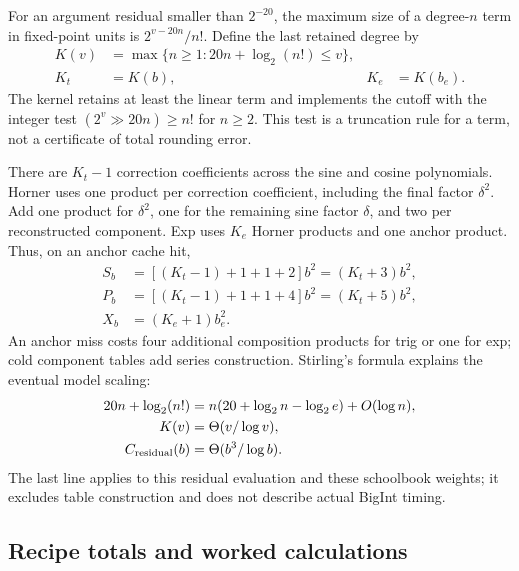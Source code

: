 \documentclass[11pt,a4paper]{article}
\numberwithin{equation}{section}
\begin{document}
For an argument residual smaller than \(2^{-20}\), the maximum size
of a degree-\(n\) term in fixed-point units is \(2^{v-20n}/n!\).
Define the last retained degree by
\begin{align}
  K(v)&=\max\{n\ge1:20n+\log_2(n!)\le v\},\\
  K_t&=K(b), &K_e&=K(b_e).
\end{align}
The kernel retains at least the linear term and implements the cutoff
with the integer test \((2^v\gg20n)\ge n!\) for \(n\ge2\). This
test is a truncation rule for a term, not a certificate of total
rounding error.

There are \(K_t-1\) correction coefficients across the sine and
cosine polynomials. Horner uses one product per correction
coefficient, including the final factor \(\delta^2\). Add one product
for \(\delta^2\), one for the remaining sine factor \(\delta\), and
two per reconstructed component. Exp uses \(K_e\) Horner products
and one anchor product. Thus, on an anchor cache hit,
\begin{align}
  S_b&=[(K_t-1)+1+1+2]b^2=(K_t+3)b^2,\\
  P_b&=[(K_t-1)+1+1+4]b^2=(K_t+5)b^2,\\
  X_b&=(K_e+1)b_e^2.
\end{align}
An anchor miss costs four additional composition products for trig or
one for exp; cold component tables add series construction. Stirling's
formula explains the eventual model scaling:
\begin{align}
  20n+\log_2(n!)
    &=n(20+\log_2 n-\log_2 e)+O(\log n),\\
  K(v)&=\Theta(v/\log v),\\
  C_{\rm residual}(b)&=\Theta(b^3/\log b).
\end{align}
The last line applies to this residual evaluation and these
schoolbook weights; it excludes table construction and does not
describe actual BigInt timing.

\subsection{Recipe totals and worked calculations}
\end{document}

